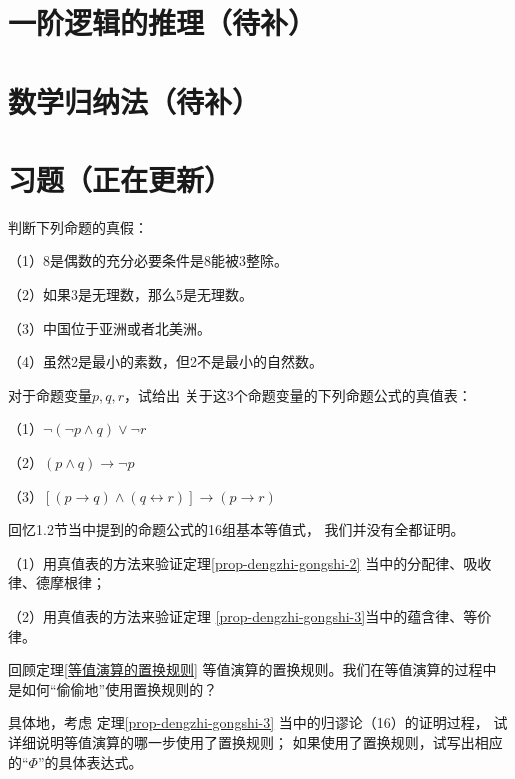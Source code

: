 \section{一阶逻辑的推理（待补）}
\section{数学归纳法（待补）}
\section{习题（正在更新）}

\begin{prob}判断下列命题的真假：

（1）8是偶数的充分必要条件是8能被$3$整除。

（2）如果3是无理数，那么5是无理数。

（3）中国位于亚洲或者北美洲。

（4）虽然2是最小的素数，但2不是最小的自然数。

\end{prob}\vs

\begin{prob}对于命题变量$p,q,r$，试给出
关于这3个命题变量的下列命题公式的真值表：

（1）$\neg(\neg p\wedge q)\vee\neg r$

（2）$(p\wedge q)\rightarrow\neg p$

（3）$[(p\rightarrow q)\wedge(q\leftrightarrow r)]
\rightarrow(p\rightarrow r)$
\end{prob}\vs

\begin{prob}[基本等值公式的验证]
回忆1.2节当中提到的命题公式的16组基本等值式，
我们并没有全都证明。

（1）用真值表的方法来验证定理\ref{prop-dengzhi-gongshi-2}
当中的分配律、吸收律、德摩根律；

（2）用真值表的方法来验证定理
\ref{prop-dengzhi-gongshi-3}当中的蕴含律、等价律。
\end{prob}\vs

\begin{prob}[关于等值演算的置换规则]
回顾定理\ref{等值演算的置换规则}
等值演算的置换规则。我们在等值演算的过程中
是如何“偷偷地”使用置换规则的？

具体地，考虑
定理\ref{prop-dengzhi-gongshi-3}
当中的归谬论（16）的证明过程，
试详细说明等值演算的哪一步使用了置换规则；
如果使用了置换规则，试写出相应的“$\Phi$”的具体表达式。
\end{prob}\vs

